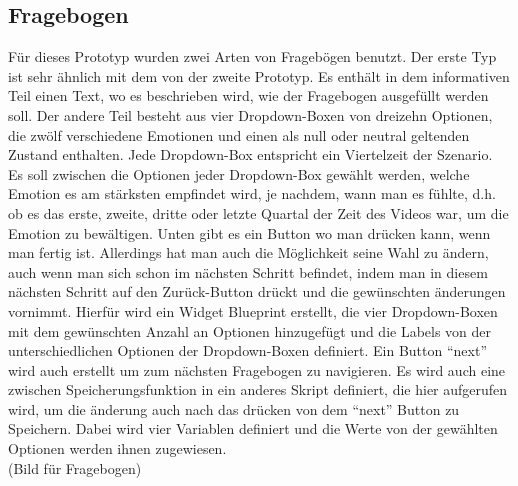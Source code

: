 \subsection{Fragebogen} \label{fragebogen-4}



F{\"u}r dieses Prototyp wurden zwei Arten von Frageb{\"o}gen benutzt. 
Der erste Typ ist sehr {\"a}hnlich mit dem von der zweite Prototyp. Es enth{\"a}lt in dem informativen Teil einen Text, wo es beschrieben wird, wie der Fragebogen ausgef{\"u}llt werden soll. Der andere Teil besteht aus vier Dropdown-Boxen von dreizehn Optionen, die zw{\"o}lf verschiedene Emotionen und einen als null oder neutral geltenden Zustand enthalten. Jede Dropdown-Box entspricht ein Viertelzeit der Szenario. Es soll zwischen die Optionen jeder Dropdown-Box gew{\"a}hlt werden, welche Emotion es am st{\"a}rksten empfindet wird, je nachdem, wann man es f{\"u}hlte, d.h. ob es das erste, zweite, dritte oder letzte Quartal der Zeit des Videos war, um die Emotion zu bew{\"a}ltigen. Unten gibt es ein Button wo man dr{\"u}cken kann, wenn man fertig ist. Allerdings hat man auch die M{\"o}glichkeit seine Wahl zu {\"a}ndern, auch wenn man sich schon im n{\"a}chsten Schritt befindet, indem man in diesem n{\"a}chsten Schritt auf den Zur{\"u}ck-Button dr{\"u}ckt und die gew{\"u}nschten {\"a}nderungen vornimmt. Hierf{\"u}r wird ein Widget Blueprint erstellt, die vier Dropdown-Boxen mit dem gew{\"u}nschten Anzahl an Optionen hinzugef{\"u}gt und die Labels von der unterschiedlichen Optionen der Dropdown-Boxen definiert. Ein Button ``next'' wird auch erstellt um zum n{\"a}chsten Fragebogen zu navigieren. Es wird auch eine zwischen Speicherungsfunktion in ein anderes Skript definiert, die hier aufgerufen wird, um die {\"a}nderung auch nach das dr{\"u}cken von dem ``next'' Button zu Speichern. Dabei wird vier Variablen definiert und die Werte von der gew{\"a}hlten Optionen werden ihnen zugewiesen. \\

(Bild f{\"u}r Fragebogen) \\


